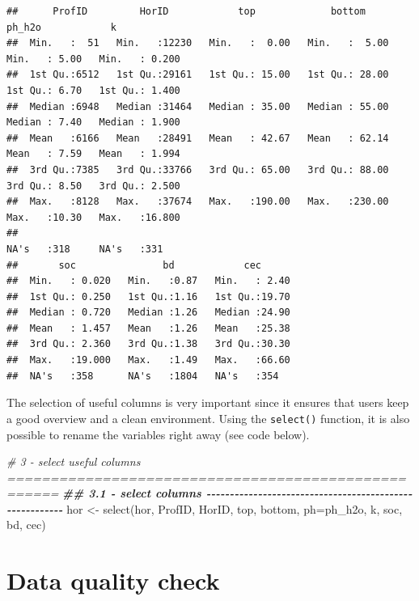 \documentclass[
  10pt,
  b5paper,
  oneside]{book}
\newenvironment{Shaded}{\begin{snugshade}}{\end{snugshade}}
\newcommand{\AttributeTok}[1]{\textcolor[rgb]{0.77,0.63,0.00}{#1}}
\newcommand{\CommentTok}[1]{\textcolor[rgb]{0.56,0.35,0.01}{\textit{#1}}}
\newcommand{\DocumentationTok}[1]{\textcolor[rgb]{0.56,0.35,0.01}{\textbf{\textit{#1}}}}
\newcommand{\FunctionTok}[1]{\textcolor[rgb]{0.00,0.00,0.00}{#1}}
\newcommand{\NormalTok}[1]{#1}
\newcommand{\OtherTok}[1]{\textcolor[rgb]{0.56,0.35,0.01}{#1}}
\begin{document}
\begin{verbatim}
##      ProfID         HorID            top             bottom           ph_h2o            k         
##  Min.   :  51   Min.   :12230   Min.   :  0.00   Min.   :  5.00   Min.   : 5.00   Min.   : 0.200  
##  1st Qu.:6512   1st Qu.:29161   1st Qu.: 15.00   1st Qu.: 28.00   1st Qu.: 6.70   1st Qu.: 1.400  
##  Median :6948   Median :31464   Median : 35.00   Median : 55.00   Median : 7.40   Median : 1.900  
##  Mean   :6166   Mean   :28491   Mean   : 42.67   Mean   : 62.14   Mean   : 7.59   Mean   : 1.994  
##  3rd Qu.:7385   3rd Qu.:33766   3rd Qu.: 65.00   3rd Qu.: 88.00   3rd Qu.: 8.50   3rd Qu.: 2.500  
##  Max.   :8128   Max.   :37674   Max.   :190.00   Max.   :230.00   Max.   :10.30   Max.   :16.800  
##                                                                   NA's   :318     NA's   :331     
##       soc               bd            cec       
##  Min.   : 0.020   Min.   :0.87   Min.   : 2.40  
##  1st Qu.: 0.250   1st Qu.:1.16   1st Qu.:19.70  
##  Median : 0.720   Median :1.26   Median :24.90  
##  Mean   : 1.457   Mean   :1.26   Mean   :25.38  
##  3rd Qu.: 2.360   3rd Qu.:1.38   3rd Qu.:30.30  
##  Max.   :19.000   Max.   :1.49   Max.   :66.60  
##  NA's   :358      NA's   :1804   NA's   :354
\end{verbatim}

The selection of useful columns is very important since it ensures that users keep a good overview and a clean environment. Using the \texttt{select()} function, it is also possible to rename the variables right away (see code below).

\begin{Shaded}
\begin{Highlighting}[]
\CommentTok{\# 3 {-} select useful columns ====================================================}
\DocumentationTok{\#\# 3.1 {-} select columns {-}{-}{-}{-}{-}{-}{-}{-}{-}{-}{-}{-}{-}{-}{-}{-}{-}{-}{-}{-}{-}{-}{-}{-}{-}{-}{-}{-}{-}{-}{-}{-}{-}{-}{-}{-}{-}{-}{-}{-}{-}{-}{-}{-}{-}{-}{-}{-}{-}{-}{-}{-}{-}{-}{-}{-}}
\NormalTok{hor }\OtherTok{\textless{}{-}} \FunctionTok{select}\NormalTok{(hor, ProfID, HorID, top, bottom, }\AttributeTok{ph=}\NormalTok{ph\_h2o, k, soc, bd, cec)}
\end{Highlighting}
\end{Shaded}

\hypertarget{data-quality-check}{%
\section{Data quality check}\label{data-quality-check}}
\end{document}

